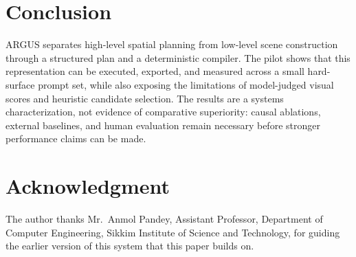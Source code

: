\documentclass[conference]{IEEEtran}
\begin{document}
\section{Conclusion}
ARGUS separates high-level spatial planning from low-level scene construction through a structured plan and a deterministic compiler. The pilot shows that this representation can be executed, exported, and measured across a small hard-surface prompt set, while also exposing the limitations of model-judged visual scores and heuristic candidate selection. The results are a systems characterization, not evidence of comparative superiority: causal ablations, external baselines, and human evaluation remain necessary before stronger performance claims can be made.

\section*{Acknowledgment}
The author thanks Mr.\ Anmol Pandey, Assistant Professor, Department of Computer Engineering, Sikkim Institute of Science and Technology, for guiding the earlier version of this system \cite{dahal2026thesis} that this paper builds on.



\end{document}
